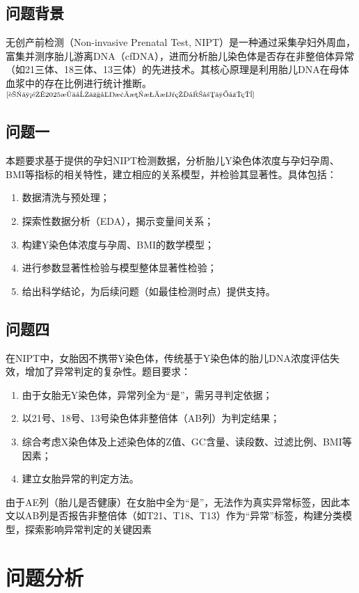 \documentclass[withoutpreface,bwprint]{cumcmthesis} %
\begin{document}
\subsection{问题背景}
无创产前检测（Non-invasive Prenatal Test, NIPT）是一种通过采集孕妇外周血，富集并测序胎儿游离DNA（cfDNA），进而分析胎儿染色体是否存在非整倍体异常（如21三体、18三体、13三体）的先进技术。其核心原理是利用胎儿DNA在母体血浆中的存在比例进行统计推断。$^\text{\cite{蒋丽雅2025无创产前检测技术的发展与应用}}$
\subsection{问题一}
本题要求基于提供的孕妇NIPT检测数据，分析胎儿Y染色体浓度与孕妇孕周、BMI等指标的相关特性，建立相应的关系模型，并检验其显著性。具体包括：
\begin{enumerate}
    \item 数据清洗与预处理；
    \item 探索性数据分析（EDA），揭示变量间关系；
    \item 构建Y染色体浓度与孕周、BMI的数学模型；
    \item 进行参数显著性检验与模型整体显著性检验；
    \item 给出科学结论，为后续问题（如最佳检测时点）提供支持。
\end{enumerate}


\subsection{问题四}
在NIPT中，女胎因不携带Y染色体，传统基于Y染色体的胎儿DNA浓度评估失效，增加了异常判定的复杂性。题目要求：
\begin{enumerate}
    \item 由于女胎无Y染色体，异常列全为“是”，需另寻判定依据；
    \item 以21号、18号、13号染色体非整倍体（AB列）为判定结果；
    \item 综合考虑X染色体及上述染色体的Z值、GC含量、读段数、过滤比例、BMI等因素；
    \item 建立女胎异常的判定方法。
\end{enumerate}


由于AE列（胎儿是否健康）在女胎中全为“是”，无法作为真实异常标签，因此本文以AB列是否报告非整倍体（如T21、T18、T13）作为“异常”标签，构建分类模型，探索影响异常判定的关键因素

\section{问题分析}
\end{document}
